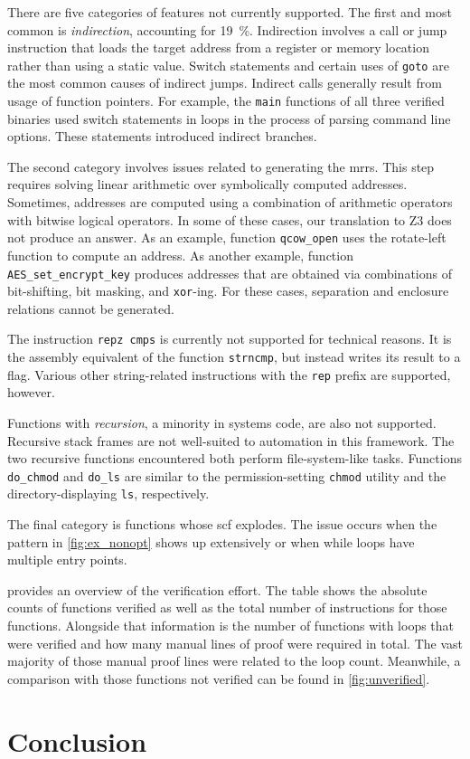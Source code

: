 There are five categories of features not currently supported.
The first and most common is \emph{indirection}, accounting for \SI{19}{\percent}.
Indirection involves a call or jump instruction
that loads the target address from a register or memory location
rather than using a static value.
Switch statements and certain uses of \texttt{goto}
are the most common causes of indirect jumps.
Indirect calls generally result from usage of function pointers.
For example, the \lstinline|main| functions of all three verified binaries
used switch statements in loops in the process of parsing command line options.
These statements introduced indirect branches.

The second category involves issues related to generating the \acp{mrr}.
This step requires solving linear arithmetic over symbolically computed addresses.
Sometimes, addresses are computed using a combination of arithmetic operators
with bitwise logical operators.
In some of these cases, our translation to Z3 does not produce an answer.
As an example, function \texttt{qcow\_open}
uses the rotate-left function to compute an address.
As another example, function \texttt{AES\_set\_encrypt\_key}
produces addresses that are obtained via combinations of bit-shifting,
bit masking, and \texttt{xor}-ing.
For these cases, separation and enclosure relations cannot be generated.

The instruction \texttt{repz cmps} is currently not supported for technical reasons.
It is the assembly equivalent of the function \texttt{strncmp},
but instead writes its result to a flag.
Various other string-related instructions with the \texttt{rep} prefix are supported,
however.

Functions with \emph{recursion}, a minority in systems code, are also not supported.
Recursive stack frames are not well-suited to automation in this framework.
The two recursive functions encountered both perform file-system-like tasks.
Functions \lstinline|do_chmod| and \lstinline|do_ls| are similar to the permission-setting \lstinline|chmod| utility
and the directory-displaying \lstinline|ls|, respectively.

The final category is functions whose \ac{scf} explodes.
The issue occurs when the pattern in \cref{fig:ex_nonopt} shows up extensively
or when while loops have multiple entry points.

 provides an overview of the verification effort.
The table shows the absolute counts of functions verified
as well as the total number of instructions for those functions.
Alongside that information is the number of functions with loops
that were verified and how many manual lines of proof were required in total.
The vast majority of those manual proof lines were related to the loop count.
Meanwhile, a comparison with those functions not verified
can be found in \cref{fig:unverified}.

\section{Conclusion}
